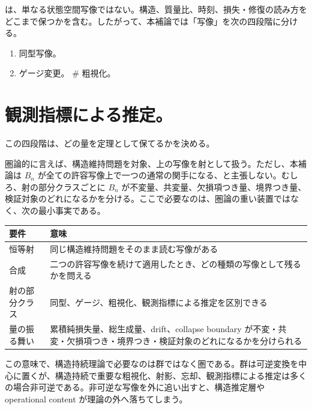 \documentclass[12pt,a4paper]{article}
\begin{document}
は、単なる状態空間写像ではない。構造、質量比、時刻、損失・修復の読み方をどこまで保つかを含む。したがって、本補論では「写像」を次の四段階に分ける。

\begin{enumerate}
\def\labelenumi{\arabic{enumi}.}
\tightlist
\item
  同型写像。
\item
  ゲージ変更。 \# 粗視化。
\end{enumerate}

\section{観測指標による推定。}\label{ux89b3ux6e2cux6307ux6a19ux306bux3088ux308bux63a8ux5b9a}

この四段階は、どの量を定理として保てるかを決める。

圏論的に言えば、構造維持問題を対象、上の写像を射として扱う。ただし、本補論は \(B_{n}\) が全ての許容写像上で一つの通常の関手になる、と主張しない。むしろ、射の部分クラスごとに \(B_{n}\) が不変量、共変量、欠損項つき量、境界つき量、検証対象のどれになるかを分ける。ここで必要なのは、圏論の重い装置ではなく、次の最小事実である。

{\def\LTcaptype{table} %
\begin{longtable}[]{@{}
  >{\raggedright\arraybackslash}p{}
  >{\raggedright\arraybackslash}p{}@{}}
\toprule\noalign{}
\begin{minipage}[b]{\linewidth}\raggedright
要件
\end{minipage} & \begin{minipage}[b]{\linewidth}\raggedright
意味
\end{minipage} \\
\midrule\noalign{}
\endhead
\bottomrule\noalign{}
\endlastfoot
恒等射 & 同じ構造維持問題をそのまま読む写像がある \\
合成 & 二つの許容写像を続けて適用したとき、どの種類の写像として残るかを問える \\
射の部分クラス & 同型、ゲージ、粗視化、観測指標による推定を区別できる \\
量の振る舞い & 累積純損失量、総生成量、drift、collapse boundary が不変・共変・欠損項つき・境界つき・検証対象のどれになるかを分けられる \\
\end{longtable}
}

この意味で、構造持続理論で必要なのは群ではなく圏である。群は可逆変換を中心に置くが、構造持続で重要な粗視化、射影、忘却、観測指標による推定は多くの場合非可逆である。非可逆な写像を外に追い出すと、構造推定層や operational content が理論の外へ落ちてしまう。
\end{document}
